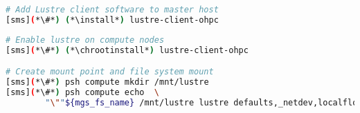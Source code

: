 
\begin{lstlisting}[language=bash,keywords={},upquote=true]
# Add Lustre client software to master host
[sms](*\#*) (*\install*) lustre-client-ohpc
\end{lstlisting}

\begin{lstlisting}[language=bash,keywords={},upquote=true]
# Enable lustre on compute nodes
[sms](*\#*) (*\chrootinstall*) lustre-client-ohpc

# Create mount point and file system mount
[sms](*\#*) psh compute mkdir /mnt/lustre
[sms](*\#*) psh compute echo  \
        "\""${mgs_fs_name} /mnt/lustre lustre defaults,_netdev,localflock,retry=2 0 0"\"" \>\> /etc/fstab
\end{lstlisting}
